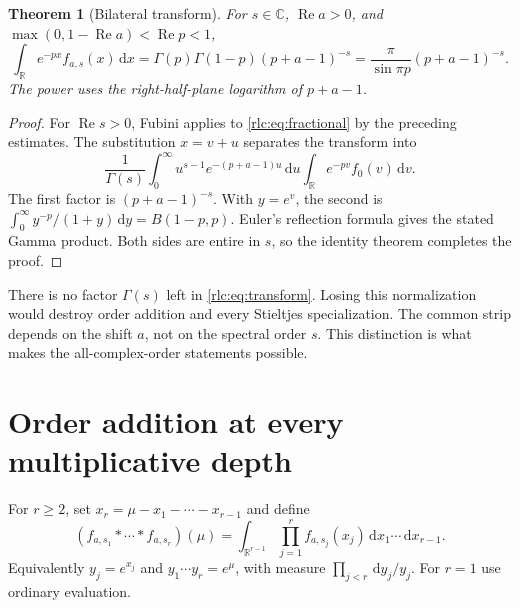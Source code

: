 \documentclass[11pt,a4paper]{article}
\numberwithin{equation}{section}
\newtheorem{theorem}{Theorem}[section]
\theoremstyle{definition}\newtheorem{definition}[theorem]{Definition}
\theoremstyle{remark}\newtheorem{remark}[theorem]{Remark}
\DeclareMathOperator{\Rea}{Re}
\newcommand{\dd}{\,\mathrm d}
\newcommand{\C}{\mathbb C}\newcommand{\R}{\mathbb R}\newcommand{\N}{\mathbb N}
\begin{document}
\begin{theorem}[Bilateral transform]\label{rlc:thm:transform}
For $s\in\C$, $\Rea a>0$, and
$\max(0,1-\Rea a)<\Rea p<1$,
\begin{equation}\label{rlc:eq:transform}
 \int_\R e^{-px}f_{a,s}(x)\dd x
 =\Gamma(p)\Gamma(1-p)(p+a-1)^{-s}
 =\frac{\pi}{\sin\pi p}(p+a-1)^{-s}.
\end{equation}
The power uses the right-half-plane logarithm of $p+a-1$.
\end{theorem}
\begin{proof}
For $\Rea s>0$, Fubini applies to \eqref{rlc:eq:fractional} by the
preceding estimates. The substitution $x=v+u$ separates the transform
into
\[
 \frac1{\Gamma(s)}\int_0^\infty
 u^{s-1}e^{-(p+a-1)u}\dd u
 \int_\R e^{-pv}f_0(v)\dd v.
\]
The first factor is $(p+a-1)^{-s}$. With $y=e^v$, the second is
$\int_0^\infty y^{-p}/(1+y)\dd y=B(1-p,p)$.
Euler's reflection formula gives the stated Gamma product. Both sides
are entire in $s$, so the identity theorem completes the proof.
\end{proof}

There is no factor $\Gamma(s)$ left in \eqref{rlc:eq:transform}.
Losing this normalization would destroy order addition and every
Stieltjes specialization. The common strip depends on the shift $a$,
not on the spectral order $s$. This distinction is what makes the
all-complex-order statements possible.



\section{Order addition at every multiplicative depth}
\label{rlc:sec:convolution}

For $r\ge2$, set $x_r=\mu-x_1-\cdots-x_{r-1}$ and define
\begin{equation}\label{rlc:eq:convolution}
 (f_{a,s_1}*\cdots*f_{a,s_r})(\mu)
 =\int_{\R^{r-1}}\prod_{j=1}^r f_{a,s_j}(x_j)
       \dd x_1\cdots\dd x_{r-1}.
\end{equation}
Equivalently $y_j=e^{x_j}$ and $y_1\cdots y_r=e^\mu$, with measure
$\prod_{j<r}\dd y_j/y_j$. For $r=1$ use ordinary evaluation.
\end{document}
